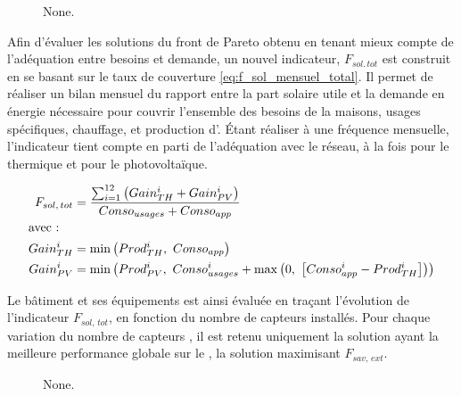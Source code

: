 \begin{figure}
    \centering
    \caption[None]
             {None.}
    \label{fig:evolution_usages_pv}
\end{figure}


Afin d’évaluer les solutions du front de Pareto obtenu en tenant mieux compte de
l’adéquation entre besoins et demande, un nouvel indicateur, $F_{sol.\, tot}$ est construit
en se basant sur le taux de couverture \eqref{eq:f_sol_mensuel_total}. Il permet
de réaliser un bilan mensuel du rapport entre la part solaire utile et la demande en
énergie nécessaire pour couvrir l’ensemble des besoins de la maisons, usages spécifiques,
chauffage, et production d’. Étant réaliser à une fréquence mensuelle, l’indicateur
tient compte en parti de l’adéquation avec le réseau, à la fois pour le thermique et
pour le photovoltaïque.

\begin{subequations}\label{eq:f_sol_mensuel_total}
    \begin{align}
        F_{sol,\, tot} &= \frac{\sum_{i=1}^{12}\left(Gain_{TH}^{i} + Gain_{PV}^{i} \right)}{Conso_{usages} + Conso_{app}} \\
        \shortintertext{avec~:}
        Gain_{TH}^{i} &= \min \left(Prod_{TH}^{i},\ Conso_{app} \right) \\
        Gain_{PV}^{i} &= \min \left(Prod_{PV}^{i},\ Conso_{usages}^{i} + \max\left(0,\ \left[Conso_{app}^{i} - Prod_{TH}^{i} \right]\right) \right)
    \end{align}
\end{subequations}

Le bâtiment et ses équipements est ainsi évaluée en traçant l’évolution de l’indicateur $F_{sol,\, tot}$,
en fonction du nombre de capteurs  installés. Pour chaque variation du nombre de capteurs ,
il est retenu uniquement la solution ayant la meilleure performance globale sur le , la solution
maximisant $F_{sav,\,ext}$.

\begin{figure}
    \centering
    \caption[None]
             {None.}
    \label{fig:fsoltot_vs_pvnumber}
\end{figure}



